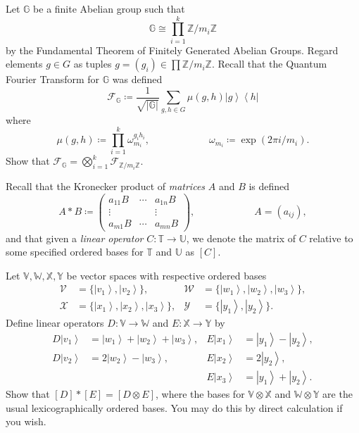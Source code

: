 \documentclass[oneside]{amsart}  %
\newcommand{\ZZ}{\mathbb{Z}}
\newcommand{\m}[1]{\mathbb{#1}}      %
\newcommand{\alg}[1]{\m{#1}}         %
\newcommand{\cl}[1]{\mathcal{#1}}    %
\theoremstyle{plain}
\theoremstyle{definition}
\theoremstyle{remark}
\newcommand{\pmat}[1]{ \begin{pmatrix} #1 \end{pmatrix} }
\newcommand{\ds}[1]{ \displaystyle{#1} }
\numberwithin{equation}{section}  %
\newcommand{\bra}[1]{ \left< #1 \right| }
\newcommand{\ket}[1]{ \left| #1 \right> }
\begin{document}
\newpage \phantom{.} \vspace{-2em}

\begin{questions}
\item Let $\m{G}$ be a finite Abelian group such that
\[
  \m{G}
  \cong \prod_{i=1}^k \ZZ/m_i\ZZ
\]
by the Fundamental Theorem of Finitely Generated Abelian Groups. Regard elements
$g\in G$ as tuples $g = (g_i) \in \prod \ZZ/m_i\ZZ$. Recall that the Quantum
Fourier Transform for $\alg{G}$ was defined
\[
  \cl{F}_{\alg{G}}
  \coloneqq \frac{1}{\sqrt{|\alg{G}|}} \sum_{g,h\in G} \mu(g,h) \ket{g}\bra{h}
\]
where
\[
  \mu(g,h) \coloneqq \prod_{i=1}^k \omega_{m_i}^{g_i h_i},
  \hspace{6em}
  \omega_{m_i} \coloneqq \exp(2\pi i / m_i).
\]
Show that $\ds{ \cl{F}_{\alg{G}} = \bigotimes_{i=1}^k \cl{F}_{\ZZ/m_i\ZZ} }$.

\newpage \phantom{.} \vspace{-2em}

\item Recall that the Kronecker product of \emph{matrices} $A$ and $B$ is
defined
\[
  A * B
  \coloneqq 
  \pmat{ a_{11} B & \cdots & a_{1n} B \\
         \vdots   &        & \vdots \\
         a_{m1} B & \cdots & a_{mn} B },
  \hspace{6em}
  A = (a_{ij}),
\]
and that given a \emph{linear operator} $C: \alg{T} \to \alg{U}$, we denote the
matrix of $C$ relative to some specified ordered bases for $\alg{T}$ and
$\alg{U}$ as $[C]$.

\smallskip

Let $\alg{V}, \alg{W}, \alg{X}, \alg{Y}$ be vector spaces with respective
ordered bases
\begin{align*}
  \cl{V} &= \big\{ \ket{v_1}, \ket{v_2} \big\},
    & \cl{W} &= \big\{ \ket{w_1}, \ket{w_2}, \ket{w_3} \big\}, \\
  \cl{X} &= \big\{ \ket{x_1}, \ket{x_2}, \ket{x_3} \big\},
    & \cl{Y} &= \big\{ \ket{y_1}, \ket{y_2} \big\}.
\end{align*}
Define linear operators $D: \alg{V}\to \alg{W}$ and $E: \alg{X}\to \alg{Y}$ by
\begin{align*}
  D\ket{v_1} &= \ket{w_1} + \ket{w_2} + \ket{w_3},
    & E\ket{x_1} &= \ket{y_1} - \ket{y_2}, \\
  D\ket{v_2} &= 2\ket{w_2} - \ket{w_3},
    & E\ket{x_2} &= 2\ket{y_2}, \\
  && E\ket{x_3} &= \ket{y_1} + \ket{y_2}.
\end{align*}
Show that $[D]*[E] = [D\otimes E]$, where the bases for $\alg{V}\otimes \alg{X}$
and $\alg{W}\otimes \alg{Y}$ are the usual lexicographically ordered bases. You
may do this by direct calculation if you wish.


\end{questions}
\end{document}
